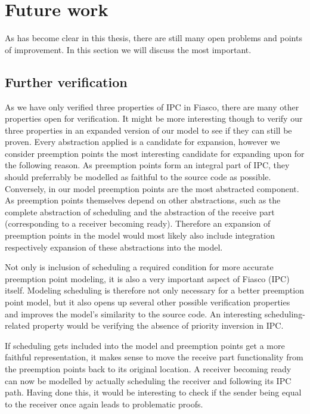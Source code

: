 \section{Future work}
As has become clear in this thesis, there are still many open problems and points of improvement. In this section we will discuss the most important.

\subsection{Further verification}
As we have only verified three properties of IPC in Fiasco, there are many other properties open for verification. It might be more interesting though to verify our three properties in an expanded version of our model to see if they can still be proven. Every abstraction applied is a candidate for expansion, however we consider preemption points the most interesting candidate for expanding upon for the following reason. As preemption points form an integral part of IPC, they should preferrably be modelled as faithful to the source code as possible. Conversely, in our model preemption points are the most abstracted component. As preemption points themselves depend on other abstractions, such as the complete abstraction of scheduling and the abstraction of the receive part (corresponding to a receiver becoming ready). Therefore an expansion of preemption points in the model would most likely also include integration respectively expansion of these abstractions into the model.\emptyline

Not only is inclusion of scheduling a required condition for more accurate preemption point modeling, it is also a very important aspect of Fiasco (IPC) itself. Modeling scheduling is therefore not only necessary for a better preemption point model, but it also opens up several other possible verification properties and improves the model's similarity to the source code. An interesting scheduling-related property would be verifying the absence of priority inversion in IPC.\emptyline

If scheduling gets included into the model and preemption points get a more faithful representation, it makes sense to move the receive part functionality from the preemption points back to its original location. A receiver becoming ready can now be modelled by actually scheduling the receiver and following its IPC path. Having done this, it would be interesting to check if the sender being equal to the receiver once again leads to problematic proofs.\emptyline


